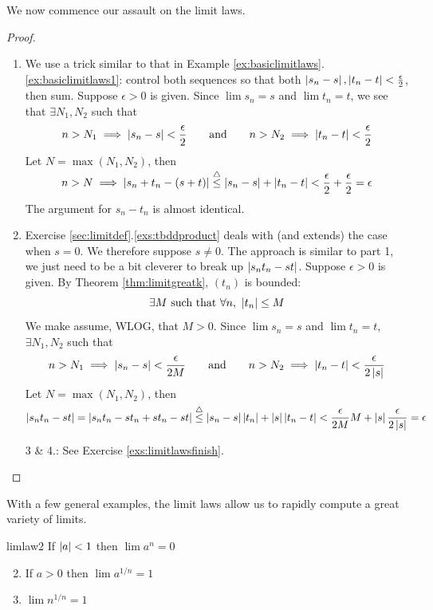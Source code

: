\bigskip

We now commence our assault on the limit laws. 

\begin{proof}
	\begin{enumerate}
	  \item We use a trick similar to that in Example \ref*{ex:basiclimitlaws}.\ref{ex:basiclimitlaws1}: control both sequences so that both $\left| s_n-s\right|,\left| t_n-t\right|<\frac\epsilon 2$, then sum.\smallbreak
	  Suppose $\epsilon>0$ is given. Since $\lim s_n=s$ and $\lim t_n=t$, we see that $\exists N_1,N_2$ such that
		\[
			n>N_1\implies \left| s_n-s\right|<\frac\epsilon 2
			\qquad\text{and}\qquad
			n>N_2\implies \left| t_n-t\right|<\frac\epsilon 2
		\]
		Let $N=\max(N_1,N_2)$, then
		\[
			n>N\implies \left| s_n+t_n-(s+t)\right|\overset{\smash{\triangle}}{\le}\left| s_n-s\right|+\left| t_n-t\right|<\smash[t]{\frac\epsilon 2+\frac\epsilon 2}=\epsilon
		\]
		The argument for $s_n-t_n$ is almost identical.
		
		\goodbreak
		
		\item Exercise \ref*{sec:limitdef}.\ref{exs:tbddproduct} deals with (and extends) the case when $s=0$. We therefore suppose $s\neq 0$. The approach is similar to part 1, we just need to be a bit cleverer to break up $\left| s_nt_n-st\right|$.\smallbreak
		Suppose $\epsilon>0$ is given. By Theorem \ref{thm:limitgreatk}, $(t_n)$ is bounded:
		\[
			\exists M\text{ such that }\forall n,\ \left| t_n\right|\le M
		\]
		We make assume, WLOG, that $M>0$. Since $\lim s_n=s$ and $\lim t_n=t$, $\exists N_1,N_2$ such that
	 	\begin{gather*}
		 	n>N_1\implies \left| s_n-s\right|<\frac\epsilon{2M}
		 	\qquad\text{and}\qquad
			n>N_2\implies \left| t_n-t\right|<\frac\epsilon{2\left| s\right|}
	 	\end{gather*}
	 	Let $N=\max(N_1,N_2)$, then
		\[
			\left| s_nt_n-st\right|=\left| s_nt_n-st_n+st_n-st\right| 
			\overset{\smash{\triangle}}{\le}\left| s_n-s\right|\left| t_n\right|+\left| s\right|\left| t_n-t\right| 
			<\frac\epsilon{2M}M+\left| s\right|\frac\epsilon{2\left| s\right|} =\epsilon
		\]
		
		\item[3]\!\& 4.: See Exercise \ref{exs:limitlawsfinish}.\qedhere
	\end{enumerate}
\end{proof}

\medskip

With a few general examples, the limit laws allow us to rapidly compute a great variety of limits.

\begin{thm}{}{limlaw2}
	\exstart If $\left| a\right|<1$ then $\lim a^n=0$%
	\begin{enumerate}\setcounter{enumi}{1}%
		\item If $a>0$ then $\lim a^{1/n}=1$
		\item $\lim n^{1/n}=1$
	\end{enumerate}
\end{thm}


